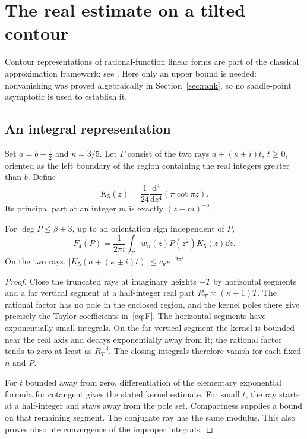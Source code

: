 \section{The real estimate on a tilted contour}\label{sec:real}
Contour representations of rational-function linear forms are part of the
classical approximation framework; see \cite{Nesterenko03}. Here only an
upper bound is needed: nonvanishing was proved algebraically in
Section~\ref{sec:rank}, so no saddle-point asymptotic is used to establish it.
\subsection{An integral representation}
Set $a=b+\tfrac12$ and $\kappa=3/5$.  Let $\Gamma$ consist of the
two rays $a+(\kappa\pm i)t$, $t\ge0$, oriented as the left boundary
of the region containing the real integers greater than $b$.  Define
\[
 K_5(z)=\frac1{24}\frac{\mathrm d^4}{\mathrm dz^4}(\pi\cot\pi z).
\]
Its principal part at an integer $m$ is exactly $(z-m)^{-5}$.
\begin{lemma}\label{lem:contour}
For $\deg P\le\beta+3$, up to an orientation sign independent of $P$,
\begin{equation}\label{eq:contour}
 F_4(P)=\frac1{2\pi i}\int_\Gamma w_n(z)P(z^2)K_5(z)\dd z.
\end{equation}
On the two rays, $|K_5(a+(\kappa\pm i)t)|\le c_\kappa e^{-2\pi t}$.
\end{lemma}
\begin{proof}
Close the truncated rays at imaginary heights $\pm T$ by horizontal
segments and a far vertical segment at a half-integer real part
$R_T\asymp(\kappa+1)T$.  The rational factor has no pole in the
enclosed region, and the kernel poles there give precisely the Taylor
coefficients in~\eqref{eq:F}.  The horizontal segments have exponentially
small integrals.  On the far vertical segment the kernel is bounded
near the real axis and decays exponentially away from it; the rational
factor tends to zero at least as $R_T^{-3}$.  The closing integrals
therefore vanish for each fixed $n$ and $P$.

For $t$ bounded away from zero, differentiation of the elementary
exponential formula for cotangent gives the stated kernel estimate.
For small $t$, the ray starts at a half-integer and stays away from
the pole set.  Compactness supplies a bound on that remaining segment.
The conjugate ray has the same modulus.  This also proves absolute
convergence of the improper integrals.
\end{proof}

